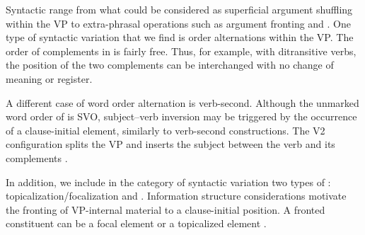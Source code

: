 \documentclass[output=paper]{langsci/langscibook}
\begin{document}
Syntactic  range from what could be considered as superficial argument shuffling within the VP to extra-phrasal operations such as argument fronting and . One type of syntactic variation that we find is order alternations within the VP. The order of complements in  is fairly free. Thus, for example, with ditransitive verbs, the position of the two complements can be interchanged with no change of meaning or register.

\eal
\zl

A different case of word order alternation is verb-second. Although the unmarked word order of  is SVO, subject--verb inversion may be triggered by the occurrence of a clause-initial element, similarly to verb-second constructions. The V2 configuration splits the VP and inserts the subject between the verb and its complements .

\eal
\zl

In addition, we include in the category of syntactic variation two types of : topicalization/focalization and . Information structure considerations motivate the fronting of VP-internal material to a clause-initial position. A fronted constituent can be a focal element  or a topicalized element .

\eal
\zl
\end{document}
